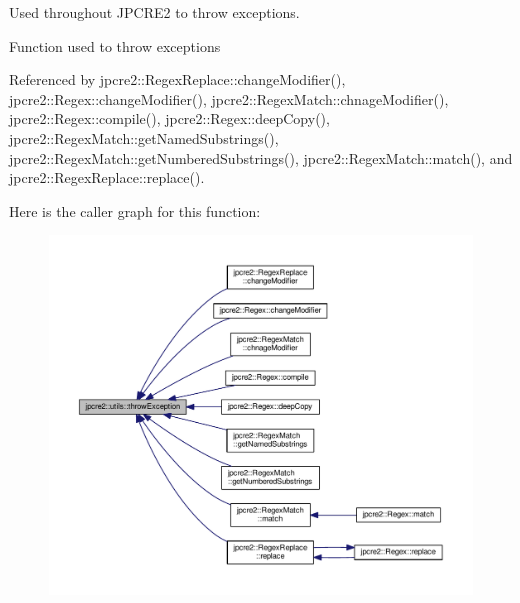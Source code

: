 Used throughout J\+P\+C\+R\+E2 to throw exceptions. 

Function used to throw exceptions 

Referenced by jpcre2\+::\+Regex\+Replace\+::change\+Modifier(), jpcre2\+::\+Regex\+::change\+Modifier(), jpcre2\+::\+Regex\+Match\+::chnage\+Modifier(), jpcre2\+::\+Regex\+::compile(), jpcre2\+::\+Regex\+::deep\+Copy(), jpcre2\+::\+Regex\+Match\+::get\+Named\+Substrings(), jpcre2\+::\+Regex\+Match\+::get\+Numbered\+Substrings(), jpcre2\+::\+Regex\+Match\+::match(), and jpcre2\+::\+Regex\+Replace\+::replace().



Here is the caller graph for this function\+:\nopagebreak
\begin{figure}[H]
\begin{center}
\leavevmode
\includegraphics[width=350pt]{namespacejpcre2_1_1utils_ae46ee8a2fbb7bc5b583aee0d1f047052_icgraph}
\end{center}
\end{figure}


